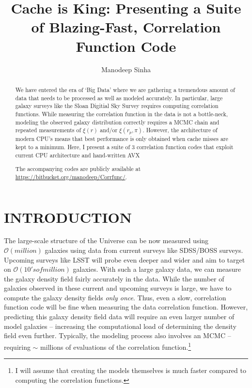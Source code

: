 \documentclass[apj]{emulateapj}
\begin{document}
\title{Cache is King: Presenting a Suite of Blazing-Fast, Correlation Function Code}

\author{Manodeep Sinha}

\begin{abstract}
We have entered the era of `Big Data' where we are gathering a tremendous amount of data that
needs to be processed as well as modeled accurately. In particular, large galaxy surveys
like the Sloan Digitial Sky Survey requires computing correlation functions. While measuring the
correlation function in the data is not a bottle-neck, modeling the observed galaxy distribution correctly
{\em} requires a MCMC chain and repeated measurements of $\xi(r)$ and/or $\xi(r_p,\pi)$. However, 
the architecture of modern CPU's means that best performance is only obtained when cache misses 
are kept to a minimum. Here, I present a suite of 3 correlation function codes that exploit 
current CPU architecture and hand-written AVX  


The accompanying codes are publicly available at \url{https://bitbucket.org/manodeep/Corrfunc/}. 
\end{abstract}


\maketitle


\section{INTRODUCTION}
\setcounter{footnote}{0}
The large-scale structure of the Universe can be now measured using $\mathcal{O}(million)$ galaxies 
using data from current surveys like SDSS/BOSS surveys. Upcoming surveys like LSST will probe even 
deeper and wider and aim to target on $\mathcal{O}(10's of million)$ galaxies. With such a large galaxy data, 
we can measure the galaxy density field fairly accurately in the data. While the number of galaxies observed 
in these current and upcoming surveys is large, we have to compute the galaxy density fields {\em only once}. Thus, 
even a slow, correlation function code will be fine when measuring the data correlation function. 
However, predicting this galaxy  density field data will require an even larger number of model galaxies -- increasing the computational 
load of determining the density field even further. Typically, the modeling process also involves an MCMC -- 
requiring $\sim$ millions of evaluations of the correlation function.\footnote{I will assume that creating the models themselves 
is much faster compared to computing the correlation functions.} 
\end{document}
